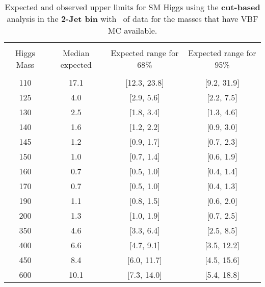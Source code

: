 \begin{table}[hbp!]
\begin{center}
\begin{tabular}{c c c c}
\hline
\vspace{-3mm} && \\
 Higgs Mass   & Median expected & Expected range for 68\% & Expected range for 95\%   \\
\vspace{-3mm} && \\
\hline
110 & 17.1 & [12.3, 23.8] & [9.2, 31.9] \\
125 & 4.0 & [2.9, 5.6] & [2.2, 7.5] \\
130 & 2.5 & [1.8, 3.4] & [1.3, 4.6] \\
140 & 1.6 & [1.2, 2.2] & [0.9, 3.0] \\
145 & 1.2 & [0.9, 1.7] & [0.7, 2.3] \\
150 & 1.0 & [0.7, 1.4] & [0.6, 1.9] \\
160 & 0.7 & [0.5, 1.0] & [0.4, 1.4] \\
170 & 0.7 & [0.5, 1.0] & [0.4, 1.3] \\
190 & 1.1 & [0.8, 1.5] & [0.6, 2.0] \\
200 & 1.3 & [1.0, 1.9] & [0.7, 2.5] \\
350 & 4.6 & [3.3, 6.4] & [2.5, 8.5] \\
400 & 6.6 & [4.7, 9.1] & [3.5, 12.2] \\
450 & 8.4 & [6.0, 11.7] & [4.5, 15.6] \\
600 & 10.1 & [7.3, 14.0] & [5.4, 18.8] \\
\hline
\end{tabular}
\caption{Expected and observed upper limits for SM Higgs using the
  {\bf cut-based} analysis in the {\bf 2-Jet bin} with \intlumiEightTeV\ of data for the 
 masses that have VBF MC available. }
\label{tab:cutbase_uls_2j}
\end{center}
\end{table}
\pagebreak
